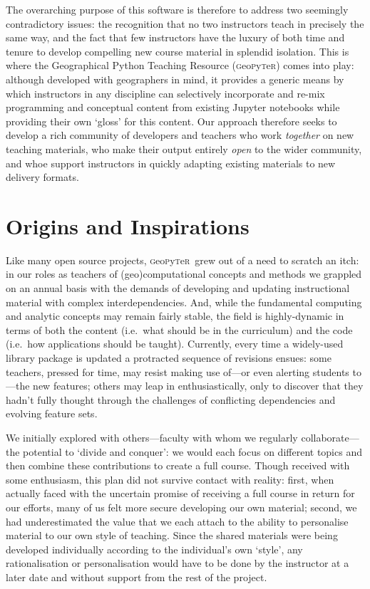 \documentclass[letter, 11pt,titlepage]{article}
\newcommand{\gp}{\textsc{g}eo\textsc{p}y\textsc{t}e\textsc{r}~\/}
\newcommand{\ie}{i.e.~\/}
\begin{document}
The overarching purpose of this software is therefore to address two seemingly
contradictory issues: the recognition that no two instructors teach in precisely
the same way, and the fact that few instructors have the luxury of both time and
tenure to develop compelling new course material in splendid isolation. This is 
where the Geographical Python Teaching Resource
(\textsc{g}eo\textsc{p}y\textsc{t}e\textsc{r}) comes into play: although
developed with geographers in mind, it provides a generic means by which
instructors in any discipline can selectively incorporate and re-mix programming
and conceptual content from existing Jupyter notebooks while providing their own
`gloss' for this content. Our approach therefore seeks to develop a rich community of developers and teachers who work \textit{together} on new teaching materials, who make their output entirely \emph{open} to the wider community, and whoe support instructors in quickly adapting existing materials to new delivery formats. 

\section{Origins and Inspirations}\label{origins-and-inspirations}

Like many open source projects, \gp grew out of a need to scratch an itch: in our roles as teachers of (geo)computational concepts and methods we grappled on an annual basis with the demands of developing and updating instructional material with complex interdependencies. And, while the fundamental computing and analytic concepts may remain fairly stable, the field is highly-dynamic in terms of both the content (\ie what should be in the curriculum) and the code (\ie how applications should be taught). Currently, every time a widely-used library package is updated a protracted sequence of revisions ensues: some teachers, pressed for time, may resist making use of---or even alerting students to---the new features; others may leap in enthusiastically, only to discover that they hadn't fully thought through the challenges of conflicting dependencies and evolving feature sets.

We initially explored with others---faculty with whom we regularly
collaborate---the potential to `divide and conquer': we would each focus on
different topics and then combine these contributions to create a full course.
Though received with some enthusiasm, this plan did not survive contact with
reality: first, when actually faced with the uncertain promise of receiving a
full course in return for our efforts, many of us felt more secure developing
our own material; second, we had underestimated the value that we each attach to
the ability to personalise material to our own style of teaching. Since the
shared materials were being developed individually according to the individual's
own `style', any rationalisation or personalisation would have to be done by the
instructor at a later date and without support from the rest of the project.
\end{document}
